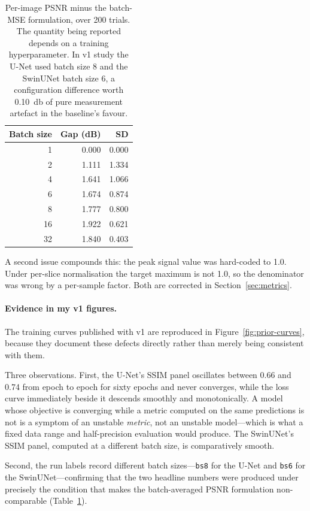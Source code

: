 \documentclass[11pt]{article}
\newcommand{\code}[1]{\texttt{\small #1}}
\begin{document}
\begin{table}[h]
\centering
\small
\begin{tabular}{@{}rrr@{}}
\toprule
Batch size & Gap (dB) & SD \\
\midrule
1  & 0.000 & 0.000 \\
2  & 1.111 & 1.334 \\
4  & 1.641 & 1.066 \\
6  & 1.674 & 0.874 \\
8  & 1.777 & 0.800 \\
16 & 1.922 & 0.621 \\
32 & 1.840 & 0.403 \\
\bottomrule
\end{tabular}
\caption{Per-image PSNR minus the batch-MSE formulation, over 200 trials. The
quantity being reported depends on a training hyperparameter. In v1
study the U-Net used batch size 8 and the SwinUNet batch size 6, a
configuration difference worth \SI{0.10}{\decibel} of pure measurement artefact
in the baseline's favour.}
\label{tab:psnr}
\end{table}

A second issue compounds this: the peak signal value was hard-coded to
\num{1.0}. Under per-slice normalisation the target maximum is not \num{1.0},
so the denominator was wrong by a per-sample factor. Both are corrected in
Section~\ref{sec:metrics}.

\paragraph{Evidence in my v1 figures.} The training curves published with
v1 are reproduced in Figure~\ref{fig:prior-curves}, because they
document these defects directly rather than merely being consistent with them.

Three observations. First, the U-Net's SSIM panel oscillates between
\num{0.66} and \num{0.74} from epoch to epoch for sixty epochs and never
converges, while the loss curve immediately beside it descends smoothly and
monotonically. A model whose objective is converging while a metric computed on
the same predictions is not is a symptom of an unstable \emph{metric}, not an
unstable model---which is what a fixed data range and half-precision evaluation
would produce. The SwinUNet's SSIM panel, computed at a different batch size, is
comparatively smooth.

Second, the run labels record different batch sizes---\code{bs8} for the U-Net
and \code{bs6} for the SwinUNet---confirming that the two headline numbers were
produced under precisely the condition that makes the batch-averaged PSNR
formulation non-comparable (Table~\ref{tab:psnr}).
\end{document}

